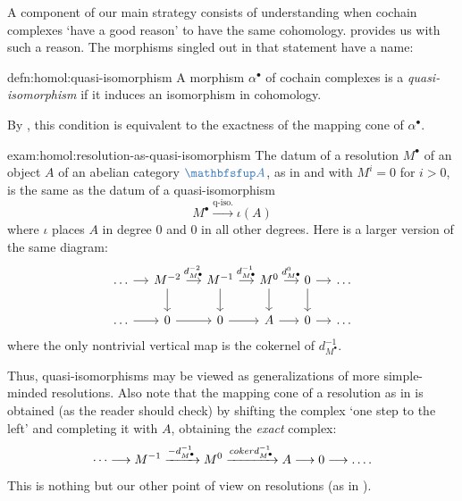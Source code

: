 A component of our main strategy consists of understanding when
cochain complexes `have a good reason' to have the same cohomology.
 provides us with such a reason. The morphisms singled
out in that statement have a name:

\begin{defn}{}{defn:homol:quasi-isomorphism}
  A morphism $\alpha^\bullet$ of cochain complexes is a
  \emph{quasi-isomorphism} if it induces an isomorphism in cohomology.
\end{defn}

By , this condition is equivalent to the exactness of
the mapping cone of $\alpha^\bullet$.

\begin{exam}{}{exam:homol:resolution-as-quasi-isomorphism}
  The datum of a resolution $M^\bullet$ of an object $A$ of an abelian
  category $\categ{A}$, as in  and with $M^i = 0$ for
  $i > 0$, is the same as the datum of a quasi-isomorphism
  \[
    M^\bullet \xrightarrow{\text{q-iso.}} \iota(A)
  \]
  where $\iota$ places $A$ in degree $0$ and $0$ in all other
  degrees. Here is a larger version of the same diagram:
  \[\begin{tikzcd}[column sep=small]
      \dots \arrow[r] & M^{-2} \arrow[r, "d^{-2}_{M^\bullet}"]
      \arrow[d] & M^{-1} \arrow[r, "d^{-1}_{M^\bullet}"] \arrow[d] &
      M^0 \arrow[r, "d^0_{M^\bullet}"] \arrow[d] & 0 \arrow[r] \arrow[d] & \dots \\
      \dots \arrow[r] & 0 \arrow[r] & 0 \arrow[r] & A \arrow[r] & 0
      \arrow[r] & \dots
    \end{tikzcd}\] where the only nontrivial vertical map is the
  cokernel of $d^{-1}_{M^\bullet}$.
\end{exam}

Thus, quasi-isomorphisms may be viewed as generalizations of more
simple-minded resolutions. Also note that the mapping cone of a
resolution as in  is obtained (as the reader should
check) by shifting the complex `one step to the left' and completing
it with $A$, obtaining the \emph{exact} complex:
\[
  \dots \longrightarrow M^{-1} \xrightarrow{-d^{-1}_{M^\bullet}} M^0
  \xrightarrow{coker d^{-1}_{M^\bullet}} A \longrightarrow 0
  \longrightarrow \dots.
\]
This is nothing but our other point of view on resolutions (as in
).

